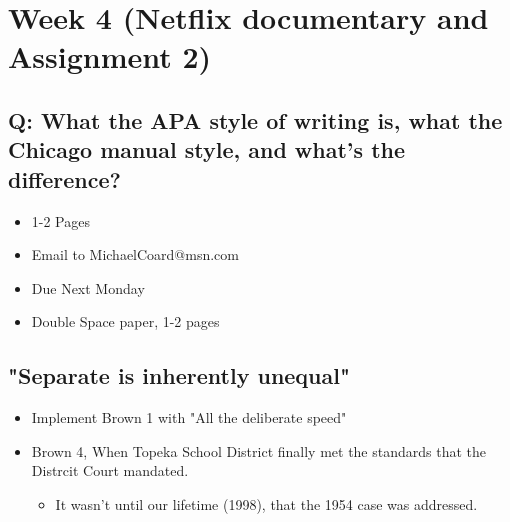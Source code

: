 \documentclass[11pt]{article}
\author{Tommy Tan}
\date{\today}
\title{}
\begin{document}
\tableofcontents

\section{Week 4 (Netflix documentary and Assignment 2)}
\label{sec:orgfc3b94a}
\subsection{Q: What the APA style of writing is, what the Chicago manual style, and what's the difference?}
\label{sec:org36cd24c}
\begin{itemize}
\item 1-2 Pages
\item Email to MichaelCoard@msn.com
\item Due Next Monday
\item Double Space paper, 1-2 pages
\end{itemize}

\subsection{"Separate is inherently unequal"}
\label{sec:orgb821cbc}
\begin{itemize}
\item Implement Brown 1 with "All the deliberate speed"
\item Brown 4, When Topeka School District finally met the standards that the Distrcit Court mandated.
\begin{itemize}
\item It wasn't until our lifetime (1998), that the 1954 case was addressed.
\end{itemize}
\end{itemize}
\end{document}
